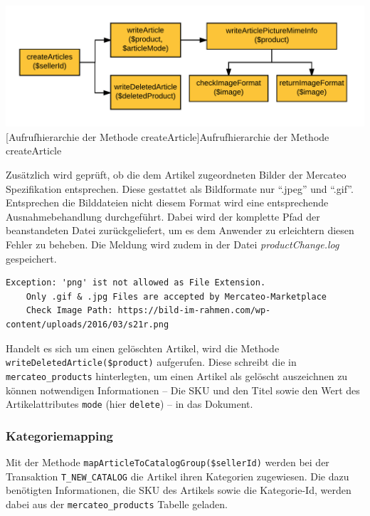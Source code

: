 {		\begin{minipage}{\linewidth}
			\vspace{1em}
			\centering
			\includegraphics[width=0.7 \linewidth]{img/createArticleHierarchie}
			[Aufrufhierarchie der Methode createArticle]{Aufrufhierarchie der Methode createArticle}
			\vspace{1em}
		\end{minipage}
	
	Zusätzlich wird geprüft, ob die dem Artikel zugeordneten Bilder der Mercateo Spezifikation entsprechen. Diese gestattet als Bildformate nur \enquote{.jpeg} und \enquote{.gif}. Entsprechen die Bilddateien nicht diesem Format wird eine entsprechende Ausnahmebehandlung durchgeführt. Dabei wird der komplette Pfad der beanstandeten Datei zurückgeliefert, um es dem Anwender zu erleichtern diesen Fehler zu beheben. Die Meldung wird zudem in der Datei \textit{productChange.log} gespeichert.\\
	
	\begin{lstlisting}[caption={Konsolenausgabe bei falschem Bildformat}]
	Exception: 'png' ist not allowed as File Extension.
	Only .gif & .jpg Files are accepted by Mercateo-Marketplace
	Check Image Path: https://bild-im-rahmen.com/wp-content/uploads/2016/03/s21r.png
	\end{lstlisting}

	Handelt es sich um einen gelöschten Artikel, wird die Methode \texttt{writeDeletedArticle(\$pro\-duct)} aufgerufen. Diese schreibt die in \texttt{mercateo\_products} hinterlegten, um einen Artikel als gelöscht auszeichnen zu können notwendigen Informationen -- Die SKU und den Titel sowie den Wert des Artikelattributes \texttt{mode} (hier \texttt{delete}) -- in das Dokument.
	
	\subsubsection{Kategoriemapping}
	
	Mit der Methode \texttt{mapArticleToCatalogGroup(\$sellerId)} werden bei der Transaktion \texttt{T\_NEW\_CATALOG} die Artikel ihren Kategorien zugewiesen. Die dazu benötigten Informationen, die SKU des Artikels sowie die Kategorie-Id, werden dabei aus der \texttt{mercateo\_products} Tabelle geladen.
	
}
